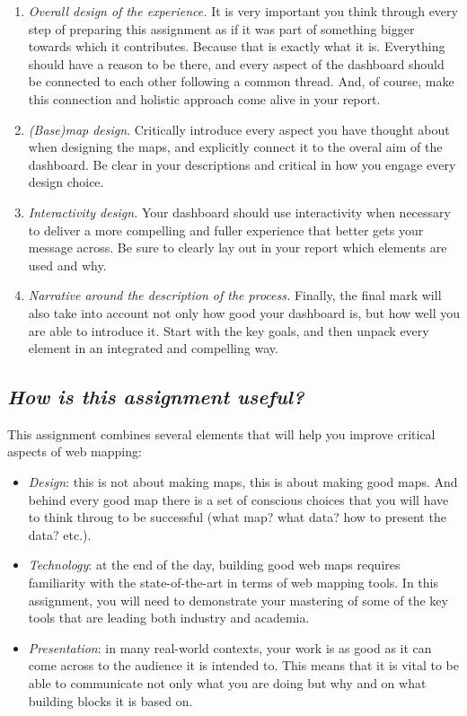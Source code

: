 \documentclass[
  letterpaper,
  DIV=11,
  numbers=noendperiod]{scrreprt}
\begin{document}
\begin{enumerate}
\def\labelenumi{\arabic{enumi}.}
\item
  \emph{Overall design of the experience.} It is very important you
  think through every step of preparing this assignment as if it was
  part of something bigger towards which it contributes. Because that is
  exactly what it is. Everything should have a reason to be there, and
  every aspect of the dashboard should be connected to each other
  following a common thread. And, of course, make this connection and
  holistic approach come alive in your report.
\item
  \emph{(Base)map design}. Critically introduce every aspect you have
  thought about when designing the maps, and explicitly connect it to
  the overal aim of the dashboard. Be clear in your descriptions and
  critical in how you engage every design choice.
\item
  \emph{Interactivity design.} Your dashboard should use interactivity
  when necessary to deliver a more compelling and fuller experience that
  better gets your message across. Be sure to clearly lay out in your
  report which elements are used and why.
\item
  \emph{Narrative around the description of the process.} Finally, the
  final mark will also take into account not only how good your
  dashboard is, but how well you are able to introduce it. Start with
  the key goals, and then unpack every element in an integrated and
  compelling way.
\end{enumerate}

\hypertarget{how-is-this-assignment-useful-1}{%
\subsection*{\texorpdfstring{\emph{How is this assignment
useful?}}{How is this assignment useful?}}\label{how-is-this-assignment-useful-1}}

This assignment combines several elements that will help you improve
critical aspects of web mapping:

\begin{itemize}
\item
  \emph{Design}: this is not about making maps, this is about making
  good maps. And behind every good map there is a set of conscious
  choices that you will have to think throug to be successful (what map?
  what data? how to present the data? etc.).
\item
  \emph{Technology}: at the end of the day, building good web maps
  requires familiarity with the state-of-the-art in terms of web mapping
  tools. In this assignment, you will need to demonstrate your mastering
  of some of the key tools that are leading both industry and academia.
\item
  \emph{Presentation}: in many real-world contexts, your work is as good
  as it can come across to the audience it is intended to. This means
  that it is vital to be able to communicate not only what you are doing
  but why and on what building blocks it is based on.
\end{itemize}
\end{document}
